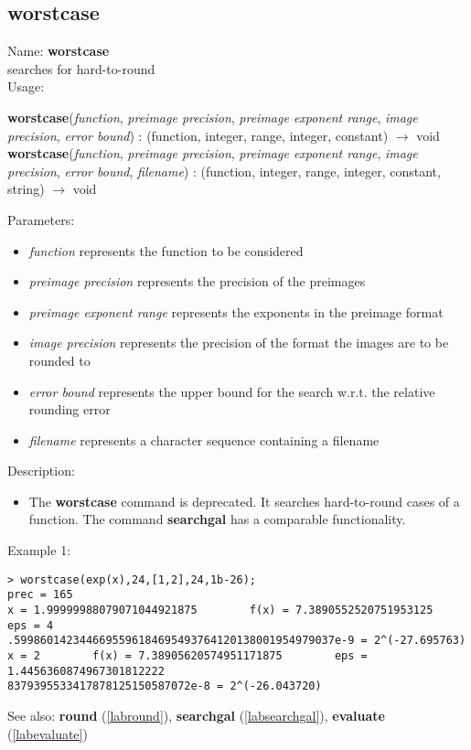 \subsection{worstcase}
\label{labworstcase}
\noindent Name: \textbf{worstcase}\\
searches for hard-to-round\\

\noindent Usage: 
\begin{center}
\textbf{worstcase}(\emph{function}, \emph{preimage precision}, \emph{preimage exponent range}, \emph{image precision}, \emph{error bound}) : (\textsf{function}, \textsf{integer}, \textsf{range}, \textsf{integer}, \textsf{constant}) $\rightarrow$ \textsf{void}\\
\textbf{worstcase}(\emph{function}, \emph{preimage precision}, \emph{preimage exponent range}, \emph{image precision}, \emph{error bound}, \emph{filename}) : (\textsf{function}, \textsf{integer}, \textsf{range}, \textsf{integer}, \textsf{constant}, \textsf{string}) $\rightarrow$ \textsf{void}\\
\end{center}
Parameters: 
\begin{itemize}
\item \emph{function} represents the function to be considered
\item \emph{preimage precision} represents the precision of the preimages
\item \emph{preimage exponent range} represents the exponents in the preimage format
\item \emph{image precision} represents the precision of the format the images are to be rounded to
\item \emph{error bound} represents the upper bound for the search w.r.t. the relative rounding error
\item \emph{filename} represents a character sequence containing a filename
\end{itemize}
\noindent Description: \begin{itemize}

\item The \textbf{worstcase} command is deprecated. It searches hard-to-round cases of
   a function. The command \textbf{searchgal} has a comparable functionality.
\end{itemize}
\noindent Example 1: 
\begin{center}\begin{minipage}{15cm}\begin{Verbatim}[frame=single]
> worstcase(exp(x),24,[1,2],24,1b-26);
prec = 165
x = 1.99999988079071044921875        f(x) = 7.3890552520751953125        eps = 4
.5998601423446695596184695493764120138001954979037e-9 = 2^(-27.695763) 
x = 2        f(x) = 7.38905620574951171875        eps = 1.4456360874967301812222
8379395533417878125150587072e-8 = 2^(-26.043720) 

\end{Verbatim}
\end{minipage}\end{center}
See also: \textbf{round} (\ref{labround}), \textbf{searchgal} (\ref{labsearchgal}), \textbf{evaluate} (\ref{labevaluate})
